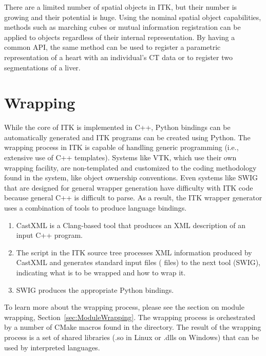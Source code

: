 There are a limited number of spatial objects in ITK, but
their number is growing and their potential is huge. Using the nominal
spatial object capabilities, methods such as marching cubes or mutual
information registration can be applied to objects regardless of their
internal representation. By having a common API, the same method can be used
to register a parametric representation of a heart with an individual's CT
data or to register two segmentations of a liver.


\section{Wrapping}
\label{sec:Wrapping}


While the core of ITK is implemented in C++, Python bindings can be
automatically generated and ITK programs can be created using Python.  The
wrapping process in ITK is capable of handling generic programming (i.e.,
extensive use of C++ templates). Systems like VTK, which use their own
wrapping facility, are non-templated and customized to the coding methodology
found in the system, like object ownership conventions. Even systems
like SWIG that are designed for general wrapper generation have difficulty
with ITK code because general C++ is difficult to parse. As a result, the ITK
wrapper generator uses a combination of tools to produce language bindings.

\begin{enumerate}
  \item CastXML is a Clang-based tool that
    produces an XML description of an input C++ program.
  \item The  script in the ITK source tree processes XML
    information produced by CastXML and generates standard input files
    ( files) to the next tool (SWIG), indicating what is to be wrapped
    and how to wrap it.
  \item SWIG produces the appropriate Python bindings.
\end{enumerate}

To learn more about the wrapping process, please see the section on module
wrapping, Section~\ref{sec:ModuleWrapping}.  The wrapping process is orchestrated by a
number of CMake macros found in the  directory. The result of
the wrapping process is a set of shared libraries (.so in Linux or .dlls on
Windows) that can be used by interpreted languages.


